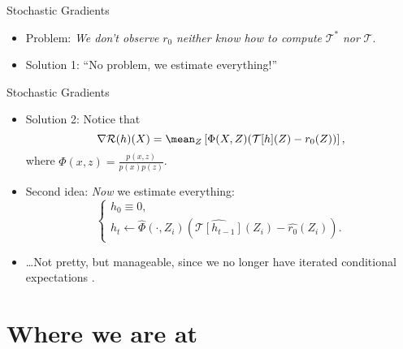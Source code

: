 \documentclass[aspectratio=169]{beamer}
\begin{document}
    \begin{frame}{Stochastic Gradients}
        \begin{itemize}
            \item<1-> Problem: \emph{We don't observe} $ r_{ 0 } $ \emph{neither know how to compute}  $ \mathcal{T}^{ * } $ \emph{nor} $ \mathcal{T} $.
            \item<3-> Solution 1: ``No problem, we estimate everything!'' 
        \end{itemize}
    \end{frame}

    \begin{frame}{Stochastic Gradients}
        \begin{itemize}
            \item<1-> Solution 2: Notice that
                \begin{equation*}
                    \nabla \risk ( h ) ( X ) = \mean_{ Z } \left[ \Phi ( X, Z ) ( \mathcal{T} [ h ] ( Z ) - r_{ 0 } ( Z ) ) \right]
                ,\end{equation*}
                where $ \Phi ( x, z ) = \frac{ p ( x, z ) }{ p ( x ) p ( z ) } $.
            \item<2-> Second idea: \emph{Now} we estimate everything:
                    \begin{equation*}
                        \begin{cases}
                            h_{ 0 } \equiv 0, \\
                            h_{ t } \leftarrow \hat{ \Phi } ( \cdot, Z_{ i } ) \left( \hat{ \mathcal{T} [ h_{ t-1 } ] } ( Z_{ i } ) - \hat{ r_{ 0 } } ( Z_{ i } ) \right).
                        \end{cases}
                    \end{equation*}
                \item<3-> \dots Not pretty, but manageable, since we no longer have iterated conditional expectations .
        \end{itemize}
    \end{frame}

    \section{Where we are at}
\end{document}

